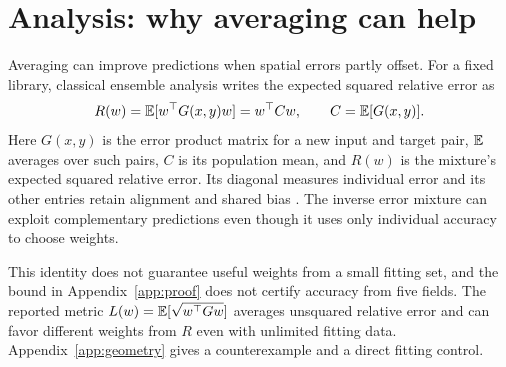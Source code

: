 \section{Analysis: why averaging can help}
\label{sec:analysis}
Averaging can improve predictions when spatial errors partly offset. For a
fixed library, classical ensemble analysis writes the expected squared relative
error as
\begin{equation}
 R(w)=\mathbb{E}[w^\top G(x,y)w]=w^\top Cw,\qquad C=\mathbb{E}[G(x,y)].
 \label{eq:riskmain}
\end{equation}
Here $G(x,y)$ is the error product matrix for a new input and target pair,
$\mathbb{E}$ averages over such pairs, $C$ is its population mean, and $R(w)$ is the
mixture's expected squared relative error. Its diagonal measures individual
error and its other entries retain alignment and shared bias
\citep{breiman1996,krogh1994}. The inverse error mixture can exploit complementary
predictions even though it uses only individual accuracy to choose weights.

This identity does not guarantee useful weights from a small fitting set,
and the bound in Appendix~\ref{app:proof} does not certify accuracy from five fields.
The reported metric $L(w)=\mathbb{E}[\sqrt{w^\top Gw}]$ averages unsquared relative error
and can favor different weights from $R$ even with unlimited fitting data.
Appendix~\ref{app:geometry} gives a counterexample and a direct fitting control.
